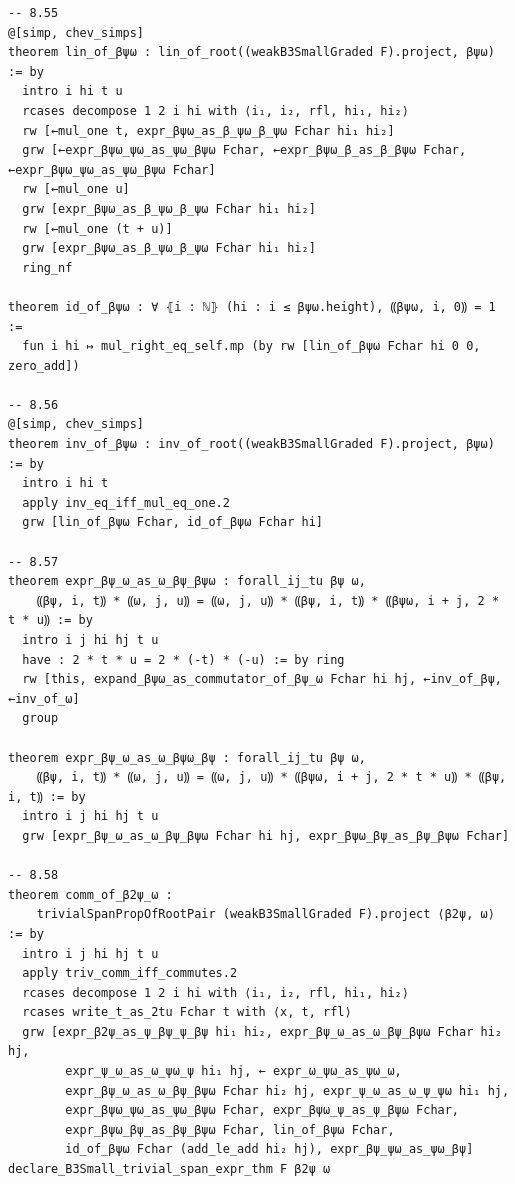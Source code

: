 \begin{Verbatim}
-- 8.55
@[simp, chev_simps]
theorem lin_of_βψω : lin_of_root((weakB3SmallGraded F).project, βψω) := by
  intro i hi t u
  rcases decompose 1 2 i hi with ⟨i₁, i₂, rfl, hi₁, hi₂⟩
  rw [←mul_one t, expr_βψω_as_β_ψω_β_ψω Fchar hi₁ hi₂]
  grw [←expr_βψω_ψω_as_ψω_βψω Fchar, ←expr_βψω_β_as_β_βψω Fchar, ←expr_βψω_ψω_as_ψω_βψω Fchar]
  rw [←mul_one u]
  grw [expr_βψω_as_β_ψω_β_ψω Fchar hi₁ hi₂]
  rw [←mul_one (t + u)]
  grw [expr_βψω_as_β_ψω_β_ψω Fchar hi₁ hi₂]
  ring_nf

theorem id_of_βψω : ∀ ⦃i : ℕ⦄ (hi : i ≤ βψω.height), ⸨βψω, i, 0⸩ = 1 :=
  fun i hi ↦ mul_right_eq_self.mp (by rw [lin_of_βψω Fchar hi 0 0, zero_add])

-- 8.56
@[simp, chev_simps]
theorem inv_of_βψω : inv_of_root((weakB3SmallGraded F).project, βψω) := by
  intro i hi t
  apply inv_eq_iff_mul_eq_one.2
  grw [lin_of_βψω Fchar, id_of_βψω Fchar hi]

-- 8.57
theorem expr_βψ_ω_as_ω_βψ_βψω : forall_ij_tu βψ ω,
    ⸨βψ, i, t⸩ * ⸨ω, j, u⸩ = ⸨ω, j, u⸩ * ⸨βψ, i, t⸩ * ⸨βψω, i + j, 2 * t * u⸩ := by
  intro i j hi hj t u
  have : 2 * t * u = 2 * (-t) * (-u) := by ring
  rw [this, expand_βψω_as_commutator_of_βψ_ω Fchar hi hj, ←inv_of_βψ, ←inv_of_ω]
  group

theorem expr_βψ_ω_as_ω_βψω_βψ : forall_ij_tu βψ ω,
    ⸨βψ, i, t⸩ * ⸨ω, j, u⸩ = ⸨ω, j, u⸩ * ⸨βψω, i + j, 2 * t * u⸩ * ⸨βψ, i, t⸩ := by
  intro i j hi hj t u
  grw [expr_βψ_ω_as_ω_βψ_βψω Fchar hi hj, expr_βψω_βψ_as_βψ_βψω Fchar]

-- 8.58
theorem comm_of_β2ψ_ω :
    trivialSpanPropOfRootPair (weakB3SmallGraded F).project ⟨β2ψ, ω⟩ := by
  intro i j hi hj t u
  apply triv_comm_iff_commutes.2
  rcases decompose 1 2 i hi with ⟨i₁, i₂, rfl, hi₁, hi₂⟩
  rcases write_t_as_2tu Fchar t with ⟨x, t, rfl⟩
  grw [expr_β2ψ_as_ψ_βψ_ψ_βψ hi₁ hi₂, expr_βψ_ω_as_ω_βψ_βψω Fchar hi₂ hj,
        expr_ψ_ω_as_ω_ψω_ψ hi₁ hj, ← expr_ω_ψω_as_ψω_ω,
        expr_βψ_ω_as_ω_βψ_βψω Fchar hi₂ hj, expr_ψ_ω_as_ω_ψ_ψω hi₁ hj,
        expr_βψω_ψω_as_ψω_βψω Fchar, expr_βψω_ψ_as_ψ_βψω Fchar,
        expr_βψω_βψ_as_βψ_βψω Fchar, lin_of_βψω Fchar,
        id_of_βψω Fchar (add_le_add hi₂ hj), expr_βψ_ψω_as_ψω_βψ]
declare_B3Small_trivial_span_expr_thm F β2ψ ω


\end{Verbatim}
